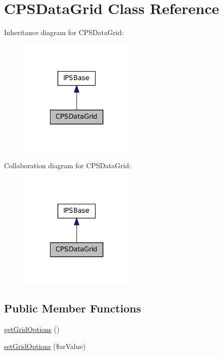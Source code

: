 \hypertarget{classCPSDataGrid}{
\section{CPSDataGrid Class Reference}
\label{classCPSDataGrid}
}


Inheritance diagram for CPSDataGrid:\nopagebreak
\begin{figure}[H]
\begin{center}
\leavevmode
\includegraphics[width=158pt]{classCPSDataGrid__inherit__graph}
\end{center}
\end{figure}


Collaboration diagram for CPSDataGrid:\nopagebreak
\begin{figure}[H]
\begin{center}
\leavevmode
\includegraphics[width=158pt]{classCPSDataGrid__coll__graph}
\end{center}
\end{figure}
\subsection*{Public Member Functions}
\begin{DoxyCompactItemize}
\item 
\hyperlink{classCPSDataGrid_a714d703744491d6a840be72c0bbc4bdc}{getGridOptions} ()
\item 
\hyperlink{classCPSDataGrid_a9d4cb8e1eb461643829da0b608ee73ed}{setGridOptions} (\$arValue)
\end{DoxyCompactItemize}
